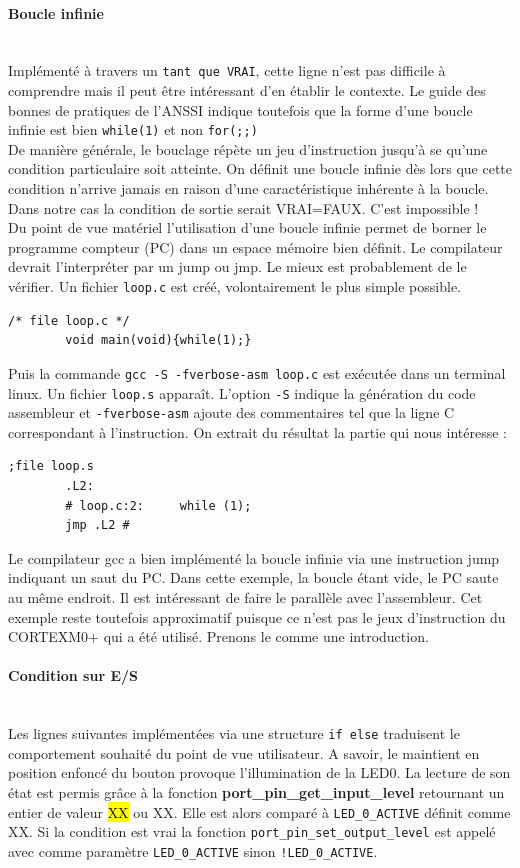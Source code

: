 \documentclass[a4paper]{article}
\begin{document}
	\paragraph{Boucle infinie}
	~~\\
	Implémenté à travers un \texttt{tant que VRAI}, cette ligne n'est pas difficile à comprendre mais il peut être intéressant d'en établir le contexte. Le guide des bonnes de pratiques de l'ANSSI\cite{ANSSI2021} indique toutefois que la forme d'une boucle infinie est bien \texttt{while(1)} et non \texttt{for(;;)}\\
	De manière générale, le bouclage répète un jeu d'instruction jusqu'à se qu'une condition particulaire soit atteinte. On définit une boucle infinie dès lors que cette condition n'arrive jamais en raison d'une caractéristique inhérente à la boucle. Dans notre cas la condition de sortie serait VRAI=FAUX. C'est impossible ! \\
	Du point de vue matériel l'utilisation d'une boucle infinie permet de borner le programme compteur (PC) dans un espace mémoire bien définit. Le compilateur devrait l'interpréter par un jump ou jmp. Le mieux est probablement de le vérifier. Un fichier \texttt{loop.c} est créé, volontairement le plus simple possible.
	\begin{lstlisting}[style=CStyle]
		/* file loop.c */
		void main(void){while(1);}
	\end{lstlisting}
	Puis la commande \texttt{gcc -S -fverbose-asm loop.c} est exécutée dans un terminal linux. Un fichier \texttt{loop.s} apparaît. L'option \texttt{-S} indique la génération du code assembleur et \texttt{-fverbose-asm} ajoute des commentaires tel que la ligne C correspondant à l'instruction. On extrait du résultat la partie qui nous intéresse :
	\begin{lstlisting}[language={[x86masm]Assembler}]
		;file loop.s
		.L2:
		# loop.c:2: 	while (1);
		jmp	.L2	#
	\end{lstlisting}
	Le compilateur gcc a bien implémenté la boucle infinie via une instruction jump indiquant un saut du PC. Dans cette exemple, la boucle étant vide, le PC saute au même endroit. Il est intéressant de faire le parallèle avec l'assembleur. Cet exemple reste toutefois approximatif puisque ce n'est pas le jeux d'instruction du CORTEXM0+ qui a été utilisé. Prenons le comme une introduction.
	
	\paragraph{Condition sur E/S}
	~~\\
	Les lignes suivantes implémentées via une structure \texttt{if else} traduisent le comportement souhaité du point de vue utilisateur. A savoir, le maintient en position enfoncé du bouton provoque l'illumination de la LED0. La lecture de son état est permis grâce à la fonction \textbf{port\_pin\_get\_input\_level} retournant un entier de valeur \hl{XX} ou XX. Elle est alors comparé à \texttt{LED\_0\_ACTIVE} définit comme XX. Si la condition est vrai la fonction \texttt{port\_pin\_set\_output\_level} est appelé avec comme paramètre \texttt{LED\_0\_ACTIVE} sinon \texttt{!LED\_0\_ACTIVE}.
	
\end{document}
